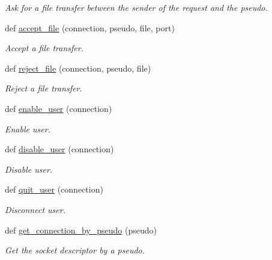 \begin{DoxyCompactItemize}
\begin{DoxyCompactList}\small\item\em Ask for a file transfer between the sender of the request and the pseudo. \end{DoxyCompactList}\item 
def \hyperlink{namespace_server_a0f21810c2b82ea1a98725185d2f3a70a}{accept\+\_\+file} (connection, pseudo, file, port)
\begin{DoxyCompactList}\small\item\em Accept a file transfer. \end{DoxyCompactList}\item 
def \hyperlink{namespace_server_a7b5be6de60d79f607c206c3675166301}{reject\+\_\+file} (connection, pseudo, file)
\begin{DoxyCompactList}\small\item\em Reject a file transfer. \end{DoxyCompactList}\item 
def \hyperlink{namespace_server_a114698f1955c3ff109f9fbbc1df306fa}{enable\+\_\+user} (connection)
\begin{DoxyCompactList}\small\item\em Enable user. \end{DoxyCompactList}\item 
def \hyperlink{namespace_server_af20de30ab901173d2bc8f58da7c05c25}{disable\+\_\+user} (connection)
\begin{DoxyCompactList}\small\item\em Disable user. \end{DoxyCompactList}\item 
def \hyperlink{namespace_server_af73d203b1f93b0f4014456fb52c7626a}{quit\+\_\+user} (connection)
\begin{DoxyCompactList}\small\item\em Disconnect user. \end{DoxyCompactList}\item 
def \hyperlink{namespace_server_a23b4ef94218cf46a4a1af4ed37c5278b}{get\+\_\+connection\+\_\+by\+\_\+pseudo} (pseudo)
\begin{DoxyCompactList}\small\item\em Get the socket descriptor by a pseudo. \end{DoxyCompactList}\end{DoxyCompactItemize}
